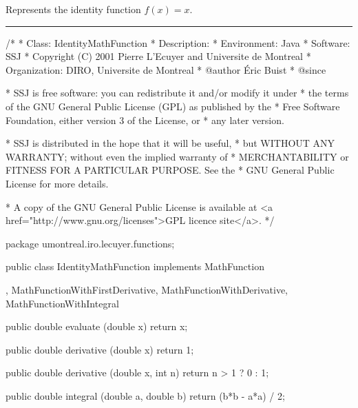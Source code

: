 
Represents the identity function $f(x)=x$.

\bigskip\hrule

\begin{code}
\begin{hide}
/*
 * Class:        IdentityMathFunction
 * Description:  
 * Environment:  Java
 * Software:     SSJ 
 * Copyright (C) 2001  Pierre L'Ecuyer and Universite de Montreal
 * Organization: DIRO, Universite de Montreal
 * @author       Éric Buist
 * @since

 * SSJ is free software: you can redistribute it and/or modify it under
 * the terms of the GNU General Public License (GPL) as published by the
 * Free Software Foundation, either version 3 of the License, or
 * any later version.

 * SSJ is distributed in the hope that it will be useful,
 * but WITHOUT ANY WARRANTY; without even the implied warranty of
 * MERCHANTABILITY or FITNESS FOR A PARTICULAR PURPOSE.  See the
 * GNU General Public License for more details.

 * A copy of the GNU General Public License is available at
   <a href="http://www.gnu.org/licenses">GPL licence site</a>.
 */
\end{hide}
package umontreal.iro.lecuyer.functions;\begin{hide}

\end{hide}

public class IdentityMathFunction implements MathFunction\begin{hide}

,
      MathFunctionWithFirstDerivative, MathFunctionWithDerivative,
      MathFunctionWithIntegral {
   public double evaluate (double x) {
      return x;
   }
   
   public double derivative (double x) {
      return 1;
   }

   public double derivative (double x, int n) {
      return n > 1 ? 0 : 1;
   }

   public double integral (double a, double b) {
      return (b*b - a*a) / 2;
   }
}\end{hide}
\end{code}
